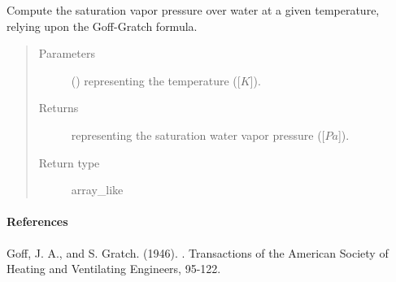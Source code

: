 \documentclass[letterpaper,10pt,english]{sphinxmanual}
\begin{document}
\begin{fulllineitems}
\label{\detokenize{api:tasmania.utils.utils_meteo.apply_goff_gratch_formula}}
Compute the saturation vapor pressure over water at a given temperature, relying upon the Goff-Gratch formula.
\begin{quote}\begin{description}
\item[{Parameters}] \leavevmode
{} () \textendash{}  representing the temperature ({[}\(K\){]}).

\item[{Returns}] \leavevmode
{} representing the saturation water vapor pressure ({[}\(Pa\){]}).

\item[{Return type}] \leavevmode
array\_like

\end{description}\end{quote}
\paragraph{References}

Goff, J. A., and S. Gratch. (1946). .              Transactions of the American Society of Heating and Ventilating Engineers, 95-122.

\end{fulllineitems}

\end{document}
